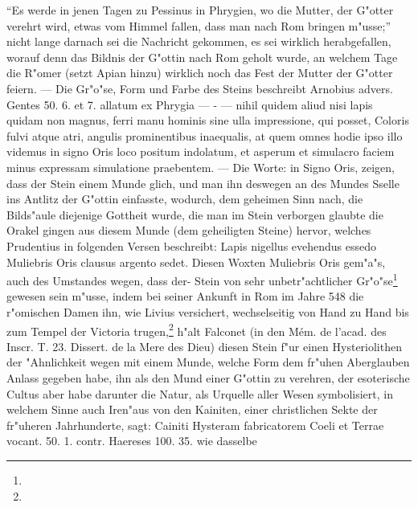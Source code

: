 \documentclass[a4paper, 11pt, oneside, polutonikogreek, german]{article}
\begin{document}
"`Es werde in jenen Tagen zu Pessinus in Phrygien, wo die Mutter, der G"otter verehrt wird, etwas vom Himmel fallen, dass man nach Rom bringen m"usse;"' nicht lange darnach sei die Nachricht gekommen, es sei wirklich herabgefallen, worauf denn das Bildnis der G"ottin nach Rom geholt wurde, an welchem Tage die R"omer (setzt Apian hinzu) wirklich noch das Fest der Mutter der G"otter feiern. --- Die Gr"o"se, Form und Farbe des Steins beschreibt Arnobius advers. Gentes 50. 6. et 7. allatum ex Phrygia --- - --- nihil quidem aliud nisi lapis quidam non magnus, ferri manu hominis sine ulla impressione, qui posset, Coloris fulvi atque atri, angulis prominentibus inaequalis, at quem omnes hodie ipso illo videmus in signo Oris loco positum indolatum, et asperum et simulacro faciem minus expressam simulatione praebentem. --- Die Worte: in Signo Oris, zeigen, dass der Stein einem Munde glich, und man ihn deswegen an des Mundes Sselle ins Antlitz der G"ottin einfasste, wodurch, dem geheimen Sinn nach, die Bilds"aule diejenige Gottheit wurde, die man im Stein verborgen glaubte die Orakel gingen aus diesem Munde (dem geheiligten Steine) hervor, welches Prudentius in folgenden Versen beschreibt: Lapis nigellus evehendus essedo Muliebris Oris clausus argento sedet. Diesen Woxten Muliebris Oris gem"a"s, auch des Umstandes wegen, dass der- Stein von sehr unbetr"achtlicher Gr"o"se\footnote{} gewesen sein m"usse, indem bei seiner Ankunft in Rom im Jahre 548 die r"omischen Damen ihn, wie Livius versichert, wechselseitig von Hand zu Hand bis zum Tempel der Victoria trugen,\footnote{} h"alt Falconet (in den Mém. de l'acad. des Inscr. T. 23. Dissert. de la Mere des Dieu) diesen Stein f"ur einen Hysteriolithen der "Ahnlichkeit wegen mit einem Munde, welche Form dem fr"uhen Aberglauben Anlass gegeben habe, ihn als den Mund einer G"ottin zu verehren, der esoterische Cultus aber habe darunter die Natur, als Urquelle aller Wesen symbolisiert, in welchem Sinne auch Iren"aus von den Kainiten, einer christlichen Sekte der fr"uheren Jahrhunderte, sagt: Cainiti Hysteram fabricatorem Coeli et Terrae vocant. 50. 1. contr. Haereses 100. 35. wie dasselbe 
\end{document}
